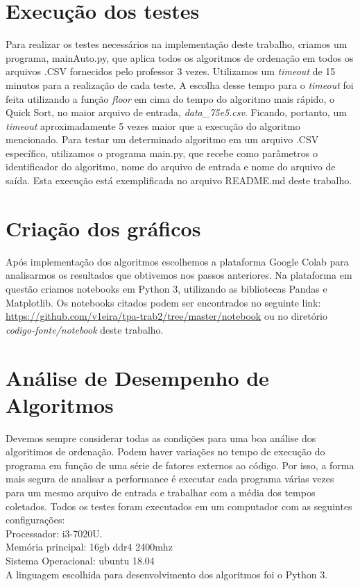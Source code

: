 \documentclass[a4paper,12pt]{scrartcl}
\begin{document}
\section{Execução dos testes}
Para realizar os testes necessários na implementação deste trabalho, criamos um programa, mainAuto.py, que aplica todos os algoritmos de ordenação em todos os arquivos .CSV fornecidos pelo professor 3 vezes. Utilizamos um \textit{timeout} de 15 minutos para a realização de cada teste. A escolha desse tempo para o \textit{timeout} foi feita utilizando a função \textit{floor} em cima do tempo do algoritmo mais rápido, o Quick Sort, no maior arquivo de entrada, \textit{data\_75e5.csv}. Ficando, portanto, um \textit{timeout} aproximadamente 5 vezes maior que a execução do algoritmo mencionado. \newline
Para testar um determinado algoritmo em um arquivo .CSV específico, utilizamos o programa main.py, que recebe como parâmetros o identificador do algoritmo, nome do arquivo de entrada e nome do arquivo de saída. Esta execução está exemplificada no arquivo README.md deste trabalho.


\section{Criação dos gráficos}

Após implementação dos algoritmos escolhemos a plataforma Google Colab para analisarmos os resultados que obtivemos nos passos anteriores. Na plataforma em questão criamos notebooks em Python 3, utilizando as bibliotecas Pandas e Matplotlib. Os notebooks citados podem ser encontrados no seguinte link: \href{https://github.com/v1eira/tpa-trab2/tree/master/notebook}{https://github.com/v1eira/tpa-trab2/tree/master/notebook} ou no diretório \textit{codigo-fonte/notebook} deste trabalho.

\section{Análise de Desempenho de Algoritmos}


Devemos sempre considerar todas as condições para uma boa análise dos algoritimos de ordenação. Podem haver variações no tempo de execução do programa em função de uma série de fatores externos ao código.  Por isso, a forma mais segura de analisar a performance é executar cada programa várias vezes para um mesmo arquivo de entrada e trabalhar com a média dos tempos coletados.\newline\newline
Todos os testes foram executados em um computador com as seguintes configurações:
\\Processador: i3-7020U.
\\Memória principal: 16gb ddr4 2400mhz 
\\Sistema Operacional: ubuntu 18.04
\\A linguagem escolhida para desenvolvimento dos algoritmos foi o Python 3.
\end{document}
